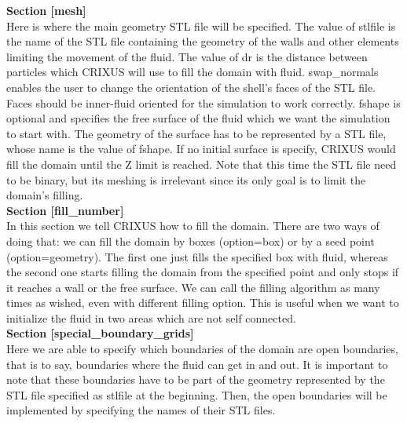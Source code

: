 \textbf{Section [mesh]}\\
Here is where the main geometry STL file will be specified. 
The value of stlfile is the name of the STL file containing 
the geometry of the walls and other elements limiting 
the movement of the fluid. 
The value of dr is the distance between particles 
which CRIXUS will use to fill the domain with fluid.
swap_normals enables the user to change the orientation 
of the shell’s faces of the STL file. Faces should be 
inner-fluid oriented for the simulation to work correctly.
fshape is optional and specifies the free surface of 
the fluid which we want the simulation to start with. 
The geometry of the surface has to be represented by a STL file, 
whose name is the value of fshape. If no initial surface is 
specify, CRIXUS would fill the domain until the Z limit 
is reached. Note that this time the STL file need to be binary, 
but its meshing is irrelevant since its only goal 
is to limit the domain’s filling.\\

\textbf{Section [fill\_number]}\\
In this section we tell CRIXUS how to fill the domain. 
There are two ways of doing that: we can fill the domain by boxes 
(option=box) or by a seed point (option=geometry).  The first one 
just fills the specified box with fluid, whereas the second 
one starts filling the domain from the specified point 
and only stops if it reaches a wall or the free surface. 
We can call the filling algorithm as many times as wished, 
even with different filling option. 
This is useful when we want to initialize the fluid 
in two areas which are not self connected. \\

\textbf{Section [special\_boundary\_grids]}\\
Here we are able to specify which boundaries of 
the domain are open boundaries, that is to say, 
boundaries where the fluid can get in and out. 
It is important to note that these boundaries have 
to be part of the geometry represented by the STL 
file specified as stlfile at the beginning. 
Then, the open boundaries will be implemented by specifying 
the names of their STL files.\\

